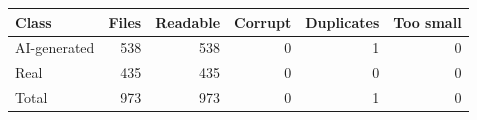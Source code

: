 \begin{tabular}{lrrrrr}
\toprule
\textbf{Class} & \textbf{Files} & \textbf{Readable} & \textbf{Corrupt} & \textbf{Duplicates} & \textbf{Too small} \\
\midrule
AI-generated & 538 & 538 & 0 & 1 & 0 \\
Real & 435 & 435 & 0 & 0 & 0 \\
Total & 973 & 973 & 0 & 1 & 0 \\
\bottomrule
\end{tabular}
